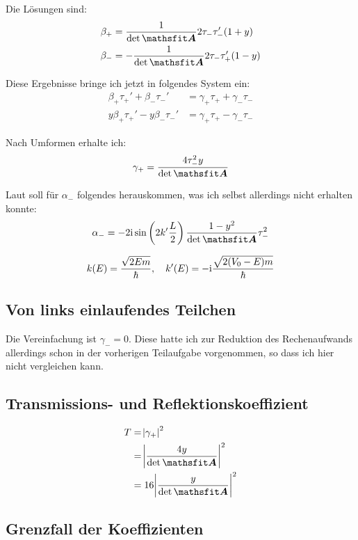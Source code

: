 Die Lösungen sind:
\begin{align*}
	\beta_+ &= \frac1\detA 2 \tau_- \tau_-' (1+y) \\
	\beta_- &= - \frac1\detA 2 \tau_- \tau_+' (1-y) \\
\end{align*}

Diese Ergebnisse bringe ich jetzt in folgendes System ein:
\begin{align*}
	\beta_+ \tau_+' + \beta_- \tau_-'
	&= \gamma_+ \tau_+ + \gamma_- \tau_- \\
	y\beta_+ \tau_+' - y\beta_- \tau_-'
	&= \gamma_+ \tau_+ - \gamma_- \tau_-
\end{align*}

Nach Umformen erhalte ich:
\[
	\gamma_+ = \frac{4 \tau_-^2 y}\detA
\]

Laut \cite[Seite 270]{nolting-theo5} soll für $\alpha_-$ folgendes
herauskommen, was ich selbst allerdings nicht erhalten konnte:
\[
	\alpha_- = - 2 \ii \sin\del{2 k' \frac L2} \frac{1-y^2}\detA \tau_-^2
\]

\[
	k(E) = \frac{\sqrt{2Em}}\hbar
	,\quad
	k'(E) = - \mathrm i \frac{\sqrt{2(V_0-E)m}}\hbar
\]

\subsection{Von links einlaufendes Teilchen}

Die Vereinfachung ist $\gamma_- = 0$. Diese hatte ich zur Reduktion des
Rechenaufwands allerdings schon in der vorherigen Teilaufgabe vorgenommen, so
dass ich hier nicht vergleichen kann.

\subsection{Transmissions- und Reflektionskoeffizient}

\begin{align*}
	T
	&= \abs{\gamma_+}^2 \\
	&= \abs{\frac{4y}\detA}^2 \\
	&= 16 \abs{\frac{y}\detA}^2 \\
\end{align*}

\subsection{Grenzfall der Koeffizienten}


\IfFileExists{\bibliographyfile}{
	
}{}



